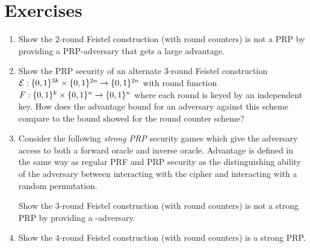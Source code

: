 
\section*{Exercises}

\begin{enumerate}[label=\textbf{Exercise \thesection.\arabic*}, wide=0pt]
  \item Show the 2-round Feistel construction (with round counters) is not a PRP by providing a PRP-adversary that gets a large advantage.
  \item Show the PRP security of an alternate 3-round Feistel construction ${\cal E}:\{0,1\}^{3k}\times\{0,1\}^{2n}\rightarrow\{0,1\}^{2n}$ with round function $F:\{0,1\}^k \times\{0,1\}^n\rightarrow\{0,1\}^n$ where each round is keyed by an independent key.
  How does the advantage bound for an adversary against this scheme compare to the bound showed for the round counter scheme?
  \item Consider the following \emph{strong PRP} security games which give the adversary access to both a forward oracle and inverse oracle.
  Advantage is defined in the same way as regular PRF and PRP security as the distinguishing ability of the adversary between interacting with the cipher and interacting with a random permutation.

	\begin{center}
\end{center}

  Show the 3-round Feistel construction (with round counters) is not a strong PRP by providing a \SPRP-adversary.
  \item Show the 4-round Feistel construction (with round counters) is a strong PRP.
\end{enumerate}
